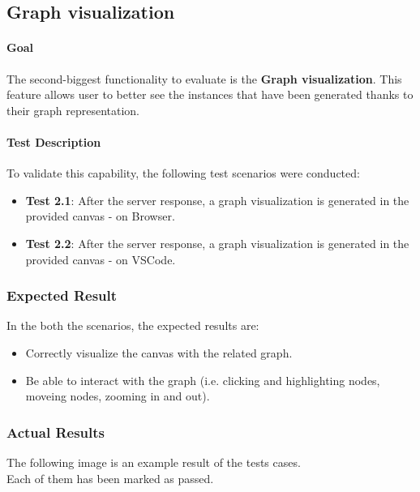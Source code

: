 
\subsection{Graph visualization}

\paragraph{Goal}
The second-biggest functionality to evaluate is the \textbf{Graph visualization}. This feature allows user to better see the instances that have been generated thanks to their graph representation.

\paragraph{Test Description}
To validate this capability, the following test scenarios were conducted:
\begin{itemize}
    \item \textbf{Test 2.1}: After the server response, a graph visualization is generated in the provided canvas - on Browser. 
    \item \textbf{Test 2.2}: After the server response, a graph visualization is generated in the provided canvas - on VSCode. 
\end{itemize}

\subsubsection{Expected Result}

In the both the scenarios, the expected results are:
\begin{itemize}
    \item Correctly visualize the canvas with the related graph.
    \item Be able to interact with the graph (i.e. clicking and highlighting nodes, moveing nodes, zooming in and out).
\end{itemize}

\subsubsection{Actual Results}

The following image is an example result of the tests cases.
\\
Each of them has been marked as passed.
\\

